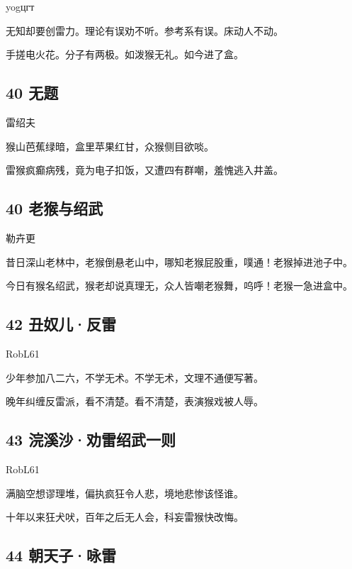 yogцгт

无知却要创雷力。理论有误劝不听。参考系有误。床动人不动。

手搓电火花。分子有两极。如泼猴无礼。如今进了盒。

\hypertarget{ux65e0ux9898-10}{%
\subsection{40 无题}\label{ux65e0ux9898-10}}

雷绍夫

猴山芭蕉绿暗，盒里苹果红甘，众猴侧目欲啖。

雷猴疯癫病残，竟为电子扣饭，又遭四有群嘲，羞愧逃入井盖。

\hypertarget{ux8001ux7334ux4e0eux7ecdux6b66}{%
\subsection{40 老猴与绍武}\label{ux8001ux7334ux4e0eux7ecdux6b66}}

勒卉更

昔日深山老林中，老猴倒悬老山中，哪知老猴屁股重，噗通！老猴掉进池子中。

今日有猴名绍武，猴老却说真理无，众人皆嘲老猴舞，呜呼！老猴一急进盒中。

\hypertarget{ux4e11ux5974ux513fux53cdux96f7}{%
\subsection{42 丑奴儿·反雷}\label{ux4e11ux5974ux513fux53cdux96f7}}

RobL61

少年参加八二六，不学无术。不学无术，文理不通便写著。

晚年纠缠反雷派，看不清楚。看不清楚，表演猴戏被人辱。

\hypertarget{ux6d63ux6eaaux6c99ux529dux96f7ux7ecdux6b66ux4e00ux5219}{%
\subsection{43
浣溪沙·劝雷绍武一则}\label{ux6d63ux6eaaux6c99ux529dux96f7ux7ecdux6b66ux4e00ux5219}}

RobL61

满脑空想谬理堆，偏执疯狂令人悲，境地悲惨该怪谁。

十年以来狂犬吠，百年之后无人会，科妄雷猴快改悔。

\hypertarget{ux671dux5929ux5b50ux548fux96f7}{%
\subsection{44 朝天子·咏雷}\label{ux671dux5929ux5b50ux548fux96f7}}

